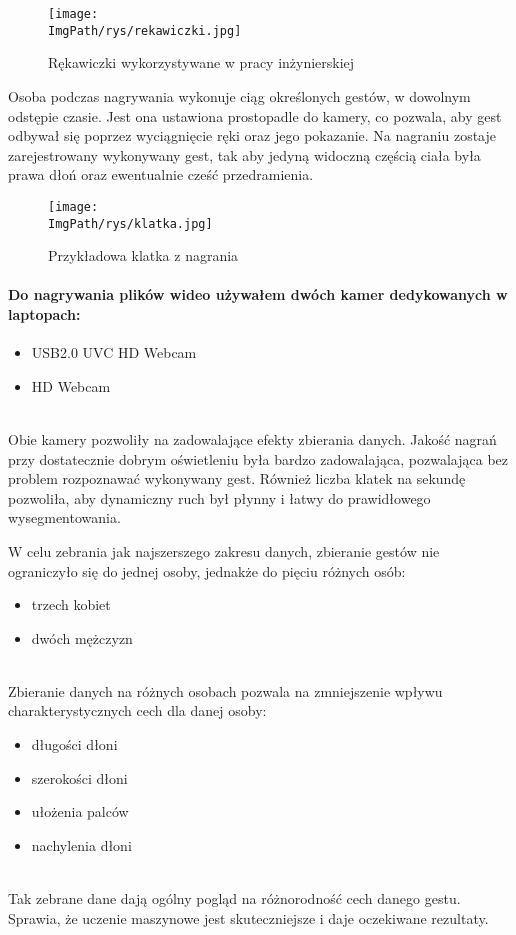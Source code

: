 \documentclass[a4paper,12pt,twoside,openany]{report}
\newcommand{\ImgPath}{.}
\begin{document}
\begin{figure}[H]	
	\centering
	\texttt{[image: \\ImgPath/rys/rekawiczki.jpg]}
	
	\caption{Rękawiczki wykorzystywane w pracy inżynierskiej}
\end{figure}

Osoba podczas nagrywania wykonuje ciąg określonych gestów, w dowolnym odstępie czasie. Jest ona ustawiona prostopadle do kamery, co pozwala, aby gest odbywał się poprzez wyciągnięcie ręki oraz jego pokazanie. Na nagraniu zostaje zarejestrowany wykonywany gest, tak aby jedyną widoczną częścią ciała była prawa dłoń oraz ewentualnie cześć przedramienia. 

\begin{figure}[H]	
	\centering
	\texttt{[image: \\ImgPath/rys/klatka.jpg]}
	
	\caption{Przykładowa klatka z nagrania}
\end{figure}

\paragraph{Do nagrywania plików wideo używałem dwóch kamer dedykowanych w laptopach:}
\begin{itemize}
	\item USB2.0 UVC HD Webcam
	\item HD Webcam
\end{itemize}
\mbox{} \\

Obie kamery pozwoliły na zadowalające efekty zbierania danych. Jakość nagrań przy dostatecznie dobrym oświetleniu była bardzo zadowalająca, pozwalająca bez problem rozpoznawać wykonywany gest. Również liczba klatek na sekundę pozwoliła, aby dynamiczny ruch był płynny i łatwy do prawidłowego wysegmentowania.

W celu zebrania jak najszerszego zakresu danych, zbieranie gestów nie ograniczyło się do jednej osoby, jednakże do pięciu różnych osób:
\begin{itemize}
	\item trzech kobiet
	\item dwóch mężczyzn
\end{itemize}
\mbox{} \\
\indent 
Zbieranie danych na różnych osobach pozwala na zmniejszenie wpływu charakterystycznych cech dla danej osoby:
\begin{itemize}
	\item długości dłoni
	\item szerokości dłoni
	\item ułożenia palców
	\item nachylenia dłoni
\end{itemize}
\mbox{} \\
\indent
Tak zebrane dane dają ogólny pogląd na różnorodność cech danego gestu. Sprawia, że uczenie maszynowe jest skuteczniejsze i daje oczekiwane rezultaty. 
\end{document}
